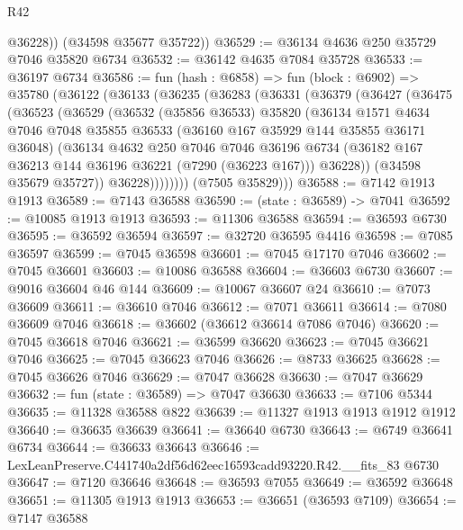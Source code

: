 \begin{lexlean}{R42}
\begin{coremodule}
{          @36228))
      (@34598 @35677 @35722))
@36529 := @36134 @4636 @250 @35729 @7046 @35820 @6734
@36532 := @36142 @4635 @7084 @35728
@36533 := @36197 @6734
@36586 := fun (hash : @6858) =>
  fun (block : @6902) =>
  @35780
    (@36122
      (@36133
        (@36235
          (@36283
            (@36331
              (@36379
                (@36427
                  (@36475
                    (@36523
                      (@36529
                        (@36532
                          (@35856 @36533)
                          @35820
                          (@36134
                            @1571
                            @4634
                            @7046
                            @7048
                            @35855
                            @36533
                            (@36160 @167 @35929 @144 @35855 @36171 @36048)
                            (@36134
                              @4632
                              @250
                              @7046
                              @7046
                              @36196
                              @6734
                              (@36182 @167 @36213 @144 @36196 @36221 (@7290 (@36223 @167)))
                              @36228))
                          (@34598 @35679 @35727))
                        @36228))))))))
        (@7505 @35829)))
@36588 := @7142 @1913 @1913
@36589 := @7143 @36588
@36590 := (state : @36589) -> @7041
@36592 := @10085 @1913 @1913
@36593 := @11306 @36588
@36594 := @36593 @6730
@36595 := @36592 @36594
@36597 := @32720 @36595 @4416
@36598 := @7085 @36597
@36599 := @7045 @36598
@36601 := @7045 @17170 @7046
@36602 := @7045 @36601
@36603 := @10086 @36588
@36604 := @36603 @6730
@36607 := @9016 @36604 @46 @144
@36609 := @10067 @36607 @24
@36610 := @7073 @36609
@36611 := @36610 @7046
@36612 := @7071 @36611
@36614 := @7080 @36609 @7046
@36618 := @36602 (@36612 @36614 @7086 @7046)
@36620 := @7045 @36618 @7046
@36621 := @36599 @36620
@36623 := @7045 @36621 @7046
@36625 := @7045 @36623 @7046
@36626 := @8733 @36625
@36628 := @7045 @36626 @7046
@36629 := @7047 @36628
@36630 := @7047 @36629
@36632 := fun (state : @36589) => @7047 @36630
@36633 := @7106 @5344
@36635 := @11328 @36588 @822
@36639 := @11327 @1913 @1913 @1912 @1912
@36640 := @36635 @36639
@36641 := @36640 @6730
@36643 := @6749 @36641 @6734
@36644 := @36633 @36643
@36646 := LexLeanPreserve.C441740a2df56d62eec16593cadd93220.R42.__fits_83 @6730
@36647 := @7120 @36646
@36648 := @36593 @7055
@36649 := @36592 @36648
@36651 := @11305 @1913 @1913
@36653 := @36651 (@36593 @7109)
@36654 := @7147 @36588
}
\end{coremodule}
\end{lexlean}
